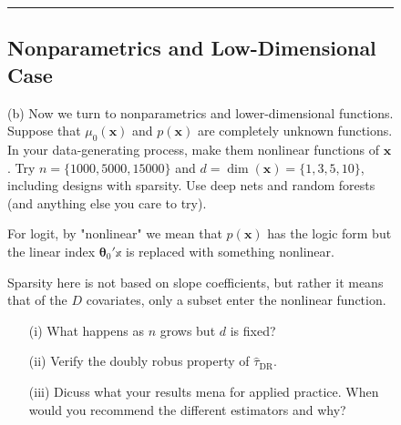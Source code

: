 \documentclass{article}
\newenvironment{colorparagraph}[1]{\par\color{#1}}{\par}
\begin{document}
\begin{figure}[H]
  \begin{colorparagraph}{questioncolor}
  \rule{\textwidth}{0.5pt}
  \label{q2b}
  \subsection{Nonparametrics and Low-Dimensional Case}

  (b) Now we turn to nonparametrics and lower-dimensional functions. Suppose that \( \mu_0(\mathbf{x}) \) and \( p(\mathbf{x}) \) are completely unknown functions. In your data-generating process, make them nonlinear functions of \( \mathbf{x} \). Try \( n = \{1000, 5000, 15000\} \) and \( d = \dim(\mathbf{x}) = \{1, 3, 5, 10\} \), including designs with sparsity. Use deep nets and random forests (and anything else you care to try).

  For logit, by "nonlinear" we mean that $p(\mathbf{x})$ has the logic form but the linear index $\boldsymbol{\theta}_{0}'\mathbb{x}$ is replaced with something nonlinear.

  Sparsity here is not based on slope coefficients, but rather it means that of the $D$ covariates, only a subset enter the nonlinear function.

  \begin{itemize}
    \item[(i)] What happens as \( n \) grows but \( d \) is fixed?
    \item[(ii)] Verify the doubly robus property of $\hat{\tau}_{\text{DR}}$.
    \item[(iii)] Dicuss what your results mena for applied practice. When would you recommend the different estimators and why?
  \end{itemize}
\end{colorparagraph}  
\end{figure}

\end{document}
